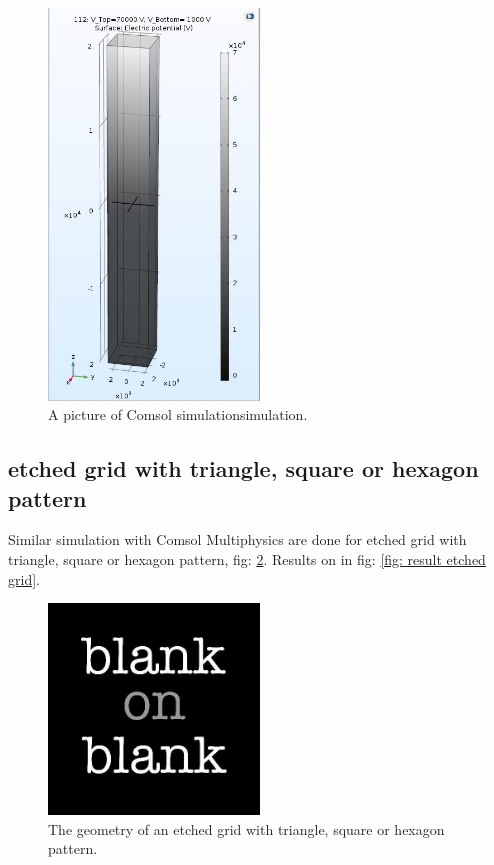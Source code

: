 \begin{figure}[h!]
  \centering
  \includegraphics[width=0.5\textwidth]
  {Figures/ComsolGeo.jpg}
  \caption{A picture of Comsol simulationsimulation. }
  \label{fig: comsol geo}
\end{figure}

\subsection{etched grid with triangle, square or hexagon pattern}
Similar simulation with Comsol Multiphysics are done for etched grid with triangle, square or hexagon pattern, fig: \ref{fig: geo etched}. Results on in fig: \ref{fig: result etched grid}.  

\begin{figure}[h!]
  \centering
  \includegraphics[width=0.5\textwidth]
  {blank.jpg}
  \caption{The geometry of an etched grid with triangle, square or hexagon pattern. }
  \label{fig: geo etched}
\end{figure}

